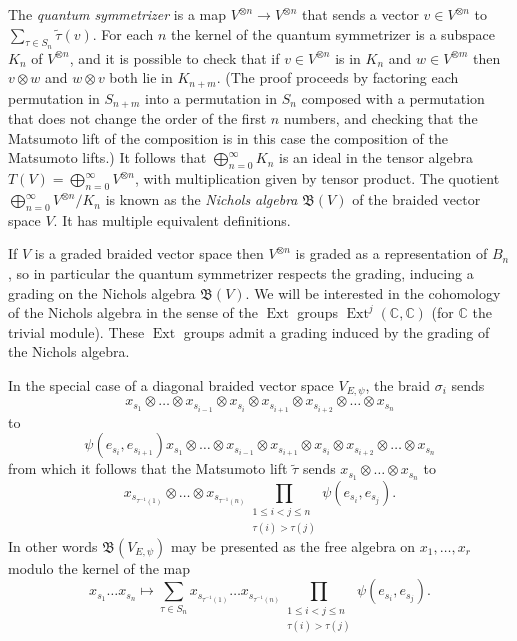\documentclass[11pt,letterpaper]{article}
\theoremstyle{definition}
\theoremstyle{remark}
\numberwithin{equation}{section}
\theoremstyle{dotless}
\newcommand{\hchi}{\psi} %
\renewcommand{\tilde}{\widetilde}
\begin{document}
The \emph{quantum symmetrizer} is a map $V^{\otimes n} \to V^{\otimes n}$ that sends a vector $v \in V^{\otimes n}$ to $\sum_{\tau \in S_n} \tilde{\tau}(v)$. For each $n$ the kernel of the quantum symmetrizer is a subspace $K_n$ of $V^{\otimes n}$, and it is possible to check that if $v \in V^{\otimes n}$ is in $K_n$ and $w \in V^{\otimes m}$ then $v\otimes w$ and $w \otimes v$ both lie in $K_{n+m}$. (The proof proceeds by factoring each permutation in $S_{n+m}$ into a permutation in $S_n$ composed with a permutation that does not change the order of the first $n$ numbers, and checking that the Matsumoto lift of the composition is in this case the composition of the Matsumoto lifts.) It follows that $\bigoplus_{n=0}^{\infty} K_n$ is an ideal in the tensor algebra $T(V) = \bigoplus_{n=0}^{\infty} V^{\otimes n}$, with multiplication given by tensor product. The quotient $\bigoplus_{n=0}^{\infty}  V^{\otimes n}/ K_n$ is known as the \emph{Nichols algebra} $\mathfrak{B}(V)$ of the braided vector space $V$. It has multiple equivalent definitions.

If $V$ is a graded  braided vector space then $V^{\otimes n}$ is graded as a representation of $B_n$, so in particular the quantum symmetrizer respects the grading, inducing a grading on the Nichols algebra $\mathfrak B(V)$. We will be interested in the cohomology of the Nichols algebra in the sense of the $\operatorname{Ext}$ groups $\operatorname{Ext}^j ( \mathbb C, \mathbb C)$ (for $\mathbb C$ the trivial module). These $\operatorname{Ext}$ groups admit a grading induced by the grading of the Nichols algebra.

In the special case of a diagonal braided vector space $V_{E,\hchi}$, the braid $\sigma_i$ sends \[x_{s_1} \otimes \dots \otimes x_{s_{i-1}} \otimes  x_{s_i} \otimes x_{s_{i+1} } \otimes x_{s_{i+2}} \otimes \dots \otimes x_{s_n}\] to 
\[\hchi(e_{s_i}, e_{s_{i+1}}) x_{s_1} \otimes \dots \otimes x_{s_{i-1}} \otimes  x_{s_{i+1} } \otimes x_{s_{i} } \otimes x_{s_{i+2}} \otimes \dots \otimes x_{s_n}\] from which it follows that the Matsumoto lift $\tilde{\tau}$ sends $x_{s_1} \otimes \dots \otimes x_{s_n}$ to \[ x_{s_{\tau^{-1}(1)}} \otimes \dots \otimes x_{s_{\tau^{-1}(n)}} \prod_{\substack{ 1\leq i < j \leq n \\ \tau(i)>\tau(j)}} \hchi( e_{s_i}, e_{s_j})  .\] In other words $\mathfrak{B}(V_{E,\hchi})$ may be presented as the free algebra on $x_1,\dots, x_r$ modulo the kernel of the map 
\[x_{s_1} \dots x_{s_n}\mapsto \sum_{\tau \in S_n}    x_{s_{\tau^{-1}(1)}}  \dots  x_{s_{\tau^{-1}(n)}}\prod_{\substack{ 1\leq i < j \leq n \\ \tau(i)>\tau(j)}} \hchi( e_{s_i}, e_{s_j}) .\]
\end{document}
